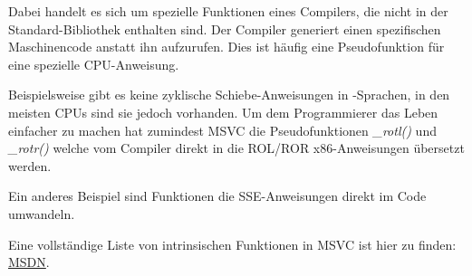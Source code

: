 \label{sec:compiler_intrinsic}


Dabei handelt es sich um spezielle Funktionen eines Compilers, die nicht in der
Standard-Bibliothek enthalten sind.
Der Compiler generiert einen spezifischen Maschinencode anstatt ihn aufzurufen.
Dies ist häufig eine Pseudofunktion für eine spezielle \ac{CPU}-Anweisung.

Beispielsweise gibt es keine zyklische Schiebe-Anweisungen in \CCpp -Sprachen,
in den meisten \ac{CPU}s sind sie jedoch vorhanden.
Um dem Programmierer das Leben einfacher zu machen hat zumindest MSVC die
Pseudofunktionen \emph{\_rotl()} und \emph{\_rotr()}\FNMSDNROTxURL{} welche vom
Compiler direkt in die ROL/ROR x86-Anweisungen übersetzt werden.

Ein anderes Beispiel sind Funktionen die SSE-Anweisungen direkt im Code umwandeln.

Eine vollständige Liste von intrinsischen Funktionen in MSVC ist hier zu finden:
\href{http://msdn.microsoft.com/en-us/library/26td21ds.aspx}{MSDN}.
